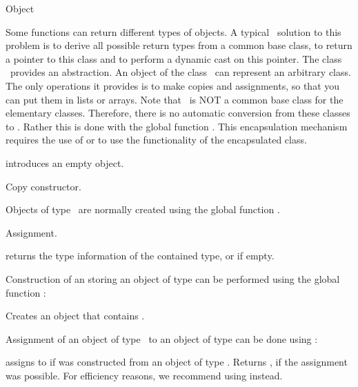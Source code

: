 \begin{ccRefClass}{Object}



\ccDefinition  
Some functions can return different types of objects. A typical
\CC\ solution to this problem is to derive all possible return
types from a common base class, to return a pointer to this 
class and to perform a dynamic cast on this pointer. The class
\ccRefName\ provides an abstraction.
An object  of the class \ccRefName\ can
represent an arbitrary class. The only operations it provides is
to make copies and assignments, so that you can put them in lists
or arrays. Note that \ccRefName\ is NOT a common base class for the
elementary classes. Therefore, there is no 
automatic conversion from these classes to \ccRefName. Rather 
this is done with the global function . This 
encapsulation mechanism requires the use of  or
 to use the functionality of the encapsulated class.

\ccCreation
{}

            {introduces an empty object.}

            {Copy constructor.}

Objects of type \ccRefName\ are normally created using the global function
.

\ccOperations

            {Assignment.}


         {returns the type information of the contained type,
          or  if empty.}

Construction of an  storing an object of type 
can be performed using the  global function :

{Creates an object that contains .}


Assignment of an object of type \ccRefName\ to an object of type  
can be done using  :

       {assigns  to  if 
        was constructed from an object of type .
        Returns , if the assignment was possible.
	For efficiency reasons, we recommend using  instead.}



\end{ccRefClass}

